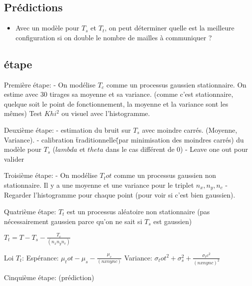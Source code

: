\documentclass[12pt]{memoir}
\begin{document}
\subsection*{Prédictions}


\begin{itemize}
\item Avec un modèle pour $T_s$ et $T_t$, on peut déterminer quelle est la meilleure configuration si on double le nombre de mailles à communiquer ?
\end{itemize}

\subsection{étape}

Première étape:
- On modélise $T_c$ comme un processus gaussien stationnaire. On estime avec 30 tirages sa moyenne et sa variance.
(comme c'est stationnaire, quelque soit le point de fonctionnement, la moyenne et la variance sont les m\^emes)
Test $Khi^2$ ou visuel avec l'histogramme.

Deuxième étape:
- estimation du bruit sur $T_s$ avec moindre carrés. (Moyenne, Variance).
- calibration \"traditionnelle\" (par minimisation des moindres carrés) du modèle pour $T_s$ ($lambda$ et $theta$ dans le cas différent de 0)
- Leave one out pour valider

Troisième étape:
- On modélise $T_tot$ comme un processus gaussien non stationnaire. Il y a une moyenne et une variance pour le triplet $n_x, n_y, n_c$
- Regarder l'histogramme pour chaque point (pour voir si c'est bien gaussien).

Quatrième étape:
$T_t$ est un processus aléatoire non stationnaire (pas nécessairement gaussien parce qu'on ne sait si $T_s$ est gaussien) 

$T_t = T - T_s -\frac{T_c}{(n_x n_y n_c)}$

Loi $T_t$:
Espérance: $\mu_tot - \mu_s - \frac{\mu_c}{(nx ny nc)}$
Variance: $\sigma_tot^2 + \sigma_s^2 + \frac{\sigma_tc^2}{(nx ny nc)^2}$


Cinquième étape:
(prédiction)
\end{document}
